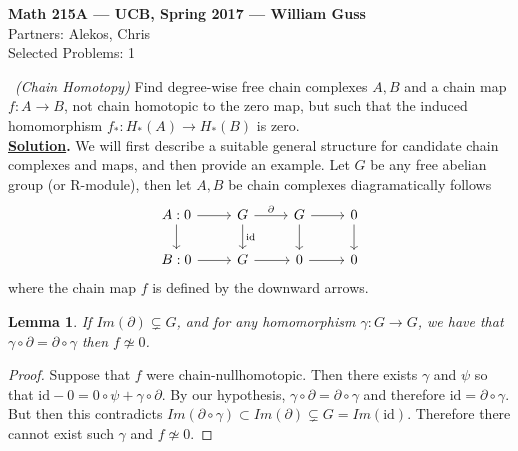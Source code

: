 \documentclass[11pt]{amsart}
\newtheorem{lemma}[theorem]{Lemma}
\theoremstyle{definition}
\numberwithin{theorem}{section}
\numberwithin{definition}{section}
\numberwithin{equation}{section}
\begin{document}
\begin{center}{\bf Math 215A --- UCB, Spring 2017 --- William Guss} \\
Partners: Alekos, Chris \\
Selected Problems: 1 
\end{center}


\medskip {}\ \emph{(Chain Homotopy)} Find degree-wise free chain complexes $A,B$ and a chain map $f: A\to B$, not chain homotopic to the zero map, but such that the induced homomorphism $f_*: H_*(A) \to H_*(B)$ is zero.\\

\noindent \textbf{\underline{Solution}.} We will first describe a suitable general structure for candidate chain complexes and maps, and then provide an example. Let $G$ be any free abelian group (or R-module), then  let $A,B$ be chain complexes diagramatically follows
\begin{equation*}
	\begin{tikzcd}
		A: 0\arrow{d} \arrow{r} & G \arrow{r}{\partial}\arrow{d}{\text{id}}  &  G \arrow{r}\arrow{d} & 0\arrow{d} \\
		B: 0 \arrow{r}& G \arrow{r}& 0 \arrow{r}& 0
	\end{tikzcd}
\end{equation*}
where the chain map $f$ is defined by the downward arrows. 
\begin{lemma}
	If $Im(\partial) \varsubsetneq G$, and for any homomorphism $\gamma: G \to G$, we have that $\gamma \circ \partial = \partial \circ \gamma$ then $f \not \simeq 0$.
\end{lemma}
\begin{proof}
	Suppose that $f$ were chain-nullhomotopic. Then there exists $\gamma$ and $\psi$ so that $\text{id} - 0 = 0 \circ \psi + \gamma \circ \partial.$ By our hypothesis, $\gamma \circ  \partial = \partial \circ \gamma$ and therefore $\text{id} = \partial \circ \gamma$. But then this contradicts $Im(\partial \circ \gamma)  \subset Im(\partial) \varsubsetneq G = Im(\text{id}).$ Therefore there cannot exist such $\gamma$ and $f \not\simeq 0.$ 
\end{proof}
\end{document}
